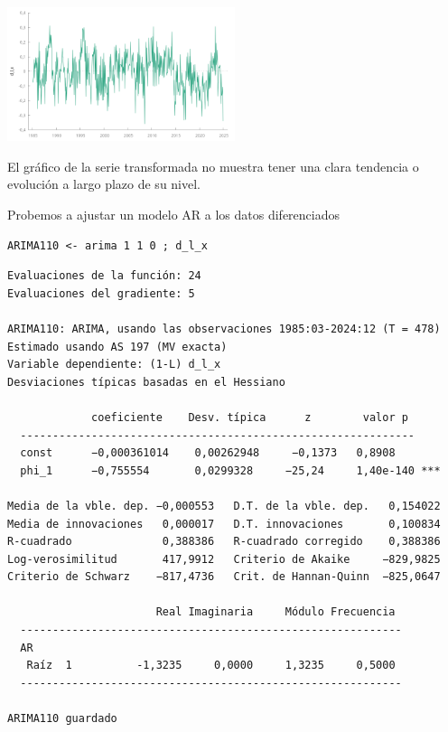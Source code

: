 \documentclass[10pt]{article}
\begin{document}
\begin{center}
\includegraphics[width=0.5\textwidth]{./EjercicioIdentificacionModeloARIMA/SerieLogEnDiferencias.png}
\end{center}

El gráfico de la serie transformada no muestra tener una clara
tendencia o evolución a largo plazo de su nivel.

Probemos a ajustar un modelo AR a los datos diferenciados

\begin{verbatim}
ARIMA110 <- arima 1 1 0 ; d_l_x
\end{verbatim}

\begin{verbatim}
Evaluaciones de la función: 24
Evaluaciones del gradiente: 5

ARIMA110: ARIMA, usando las observaciones 1985:03-2024:12 (T = 478)
Estimado usando AS 197 (MV exacta)
Variable dependiente: (1-L) d_l_x
Desviaciones típicas basadas en el Hessiano

             coeficiente    Desv. típica      z        valor p 
  -------------------------------------------------------------
  const      −0,000361014    0,00262948     −0,1373   0,8908   
  phi_1      −0,755554       0,0299328     −25,24     1,40e-140 ***

Media de la vble. dep. −0,000553   D.T. de la vble. dep.   0,154022
Media de innovaciones   0,000017   D.T. innovaciones       0,100834
R-cuadrado              0,388386   R-cuadrado corregido    0,388386
Log-verosimilitud       417,9912   Criterio de Akaike     −829,9825
Criterio de Schwarz    −817,4736   Crit. de Hannan-Quinn  −825,0647

                       Real Imaginaria     Módulo Frecuencia
  -----------------------------------------------------------
  AR
   Raíz  1          -1,3235     0,0000     1,3235     0,5000
  -----------------------------------------------------------

ARIMA110 guardado
\end{verbatim}
\end{document}
